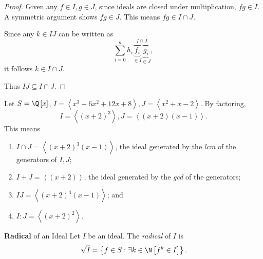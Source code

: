 \documentclass[co439]{subfiles}
\begin{document}
    \begin{proof}
        Given any $f\in I, g\in J$, since ideals are closed under multiplication, $fg\in I$. A symmetric argument shows $fg\in J$. This means $fg\in I\cap J$.

        Since any $k\in IJ$ can be written as
        \begin{equation*}
            \sum^{n}_{i=0} h_i\overbrace{\underbrace{f_i}_{\in I}\underbrace{g_i}_{\in J}}^{I\cap J},
        \end{equation*}
        it follows $k\in I\cap J$.

        Thus $IJ \subseteq I\cap J$.
    \end{proof}
    
    \begin{example}{}
        Let $S=\Q\left[ x \right]$, $I = \left< x^{3}+6x^{2}+12x+8 \right>, J = \left< x^{2}+x-2 \right>$. By factoring,
        \begin{equation*}
            I = \left< \left( x+2 \right)^{3} \right>, J = \left< \left( x+2 \right)\left( x-1 \right) \right>.  
        \end{equation*}
        This means
        \begin{enumerate}
            \item $I\cap J = \left< \left( x+2 \right)^{3}\left( x-1 \right) \right>$, the ideal generated by the \textit{lcm} of the generators of $I,J$;

            \item $I+J = \left< \left( x+2 \right) \right>$, the ideal generated by the \textit{gcd} of the generators;

            \item $IJ = \left< \left( x+2 \right)^{4}\left( x-1 \right) \right>$; and
            \item $I:J = \left< \left( x+2 \right)^{2} \right>$. 
        \end{enumerate}
    \end{example}

    \rruleline

    \begin{definition}{\textbf{Radical} of an Ideal}
        Let $I$ be an ideal. The \emph{radical} of $I$ is
        \begin{equation*}
            \sqrt{I} = \left\lbrace f\in S: \exists k\in\N\left[ f^k\in I \right] \right\rbrace.
        \end{equation*}
    \end{definition}
\end{document}
